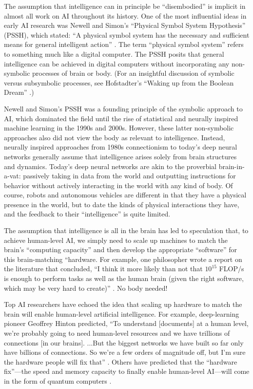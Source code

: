 \documentclass[12pt]{article}
\begin{document}
The assumption that intelligence can in principle be ``disembodied'' is implicit in almost all work on AI throughout its history.  One of the most influential ideas in early AI research was Newell and Simon's ``Physical Symbol System Hypothesis'' (PSSH), which stated: ``A physical symbol system has the necessary and sufficient means for general intelligent action'' \cite{Newell1976}. The term ``physical symbol system'' refers to something much like a digital computer.  The PSSH posits that general intelligence can be achieved in digital computers without incorporating any non-symbolic processes of brain or body.  (For an insightful discussion of symbolic versus subsymbolic processes, see Hofstadter's ``Waking up from the Boolean Dream'' \cite{Hofstadter1985b}.)

Newell and Simon's PSSH was a founding principle of the symbolic approach to AI, which dominated the field until the rise of statistical and neurally inspired machine learning in the 1990s and 2000s.  However, these latter non-symbolic approaches also did not view the body as relevant to intelligence.  Instead, neurally inspired approaches from 1980s connectionism to today's deep neural networks generally assume that intelligence arises solely from brain structures and dynamics.  Today's deep neural networks are akin to the proverbial brain-in-a-vat: passively taking in data from the world and outputting instructions for behavior without actively interacting in the world with any kind of body.  Of course, robots and autonomous vehicles are different in that they have a physical presence in the world, but to date the kinds of physical interactions they have, and the feedback to their ``intelligence'' is quite limited. 

The assumption that intelligence is all in the brain has led to speculation that, to achieve human-level AI, we simply need to scale up machines to match the brain's ``computing capacity'' and then develop the appropriate ``software'' for this brain-matching ``hardware.  For example, one philosopher wrote a report on the literature that concluded, ``I think it more likely than not that $10^{15}$ FLOP/s is enough to perform tasks as well as the human brain (given the right software, which may be very hard to create)'' \cite{Carlsmith2020}.  No body needed!

Top AI researchers have echoed the idea that scaling up hardware to match the brain will enable human-level artificial intelligence.  For example, deep-learning pioneer Geoffrey Hinton predicted, ``To understand [documents] at a human level, we're probably going to need human-level resources and we have trillions of connections [in our brains]. ...But the biggest networks we have built so far only have billions of connections. So we're a few orders of magnitude off, but I'm sure the hardware people will fix that'' \cite{Patterson2017}. Others have predicted that the ``hardware fix''---the speed and memory capacity to finally enable human-level AI---will come in the form of quantum computers \cite{Musser2018}. 
\end{document}
